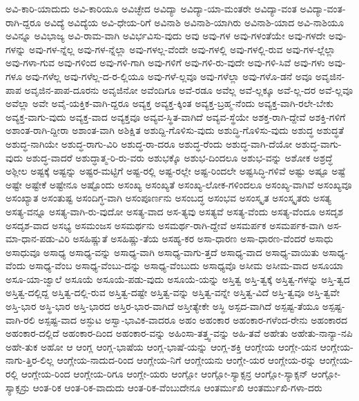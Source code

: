 {ಅವಿ-ಕಾರಿ-ಯಾದುದು
ಅವಿ-ಕಾರಿಯೂ
ಅವಿಚ್ಛೇದ
ಅವಿದ್ಯಾ
ಅವಿದ್ಯಾ-ಯಾ-ಮಂತರೇ
ಅವಿದ್ಯಾ-ವಂತ
ಅವಿದ್ಯಾ-ವಂತ-ರಾಗಿ-ದ್ದರೂ
ಅವಿದ್ಯೆ
ಅವಿದ್ಯೆಯ
ಅವಿ-ಧೇಯ-ರಿಗೆ
ಅವಿನಾಶಿ
ಅವಿನಾಶಿ-ಯಾಗಿರು
ಅವಿನಾಶಿ-ಯಾದ
ಅವಿ-ನಾಶಿಯೂ
ಅವಿನ್ನೂ
ಅವಿಭಾಜ್ಯ
ಅವಿ-ರಾಮ-ವಾಗಿ
ಅವಿರ್ಭವಿಸು-ವುದು
ಅವು
ಅವು-ಗಳ
ಅವು-ಗಳಂತೆಯೇ
ಅವು-ಗಳದೇ
ಅವು-ಗಳನ್ನು
ಅವು-ಗಳ-ನ್ನೆಲ್ಲ
ಅವು-ಗಳ-ನ್ನೆಲ್ಲಾ
ಅವು-ಗಳಲ್ಲ-ವೆಂದೇ
ಅವು-ಗಳಲ್ಲಿ
ಅವು-ಗಳಲ್ಲಿ-ರುವ
ಅವು-ಗಳ-ಲ್ಲೆಲ್ಲಾ
ಅವು-ಗಳಾ-ಗುವ
ಅವು-ಗಳಿಂದ
ಅವು-ಗಳಿ-ಗಾಗಿ
ಅವು-ಗಳಿಗೆ
ಅವು-ಗಳಿ-ರು-ವುದೇ
ಅವು-ಗಳಿ-ಸಿವೆ
ಅವು-ಗಳು
ಅವು-ಗಳೂ
ಅವು-ಗಳೆಲ್ಲ
ಅವು-ಗಳೆಲ್ಲ-ದ-ರ-ಲ್ಲಿಯೂ
ಅವು-ಗಳೆ-ಲ್ಲವೂ
ಅವು-ಗಳೆಲ್ಲಾ
ಅವು-ಗಳೊ-ಡನೆ
ಅವೂ
ಅವೃಜಿನ-ಪಾಪ
ಅವೃಜಿನ-ಪಾಪ-ದೂರನು
ಅವೃಜಿನೋ
ಅವೆಂದಿಗೂ
ಅವೆ-ರಡೂ
ಅವೆಲ್ಲ
ಅವೆ-ಲ್ಲಕ್ಕೂ
ಅವೆ-ಲ್ಲ-ದರ
ಅವೆ-ಲ್ಲವೂ
ಅವೆಲ್ಲಾ
ಅವೇ
ಅವೈ-ಯಕ್ತಿಕ-ವಾಗಿ-ದ್ದರೂ
ಅವ್ಯಕ್ತ
ಅವ್ಯಕ್ತ-ಕ್ಕಿಂತ
ಅವ್ಯಕ್ತ-ಬ್ರಹ್ಮ-ನೆಂದು
ಅವ್ಯಕ್ತ-ವಾಗಿ-ರಲೇ-ಬೇಕು
ಅವ್ಯಕ್ತ-ವಾಗು-ವುದು
ಅವ್ಯಕ್ತ-ವಾದ
ಅವ್ಯಕ್ತವೂ
ಅವ್ಯವ-ಸ್ಥಿತ-ವಾಗಿದೆ
ಅವ್ಯವ-ಸ್ಥೆಯೇ
ಅಶಕ್ತ-ರಾಗಿ-ದ್ದೇವೆ
ಅಶಕ್ತಿ-ಗಳಿಗೆ
ಅಶಾಂತ-ರಾಗಿ-ದ್ದೀರಾ
ಅಶಾಂತ-ವಾಗಿ
ಅಶಿಕ್ಷಿತ
ಅಶುದ್ದಿ-ಗೊಳಿಸು-ವುದು
ಅಶುದ್ಧಿ-ಗೊಳಿಸು-ವುದು
ಅಶುದ್ಧ
ಅಶುದ್ಧತೆ
ಅಶುದ್ಧ-ನಾಗಿಯೇ
ಅಶುದ್ಧ-ರಾಗು-ವಿರಿ
ಅಶುದ್ಧ-ರಾ-ದರೂ
ಅಶುದ್ಧ-ರೆಂದು
ಅಶುದ್ಧ-ವಾಗಿ-ದೆಯೋ
ಅಶುದ್ಧ-ವಾಗು-ವುದು
ಅಶುದ್ಧ-ವಾದರೆ
ಅಶುದ್ಧಾತ್ಮ-ರಿ-ರು-ವರು
ಅಶುಭಕ್ಕೊ
ಅಶುಭ-ದಿಂದಲೂ
ಅಶುಭ-ವನ್ನು
ಅಶೋಕ
ಅಶ್ರದ್ಧೆ
ಅಶ್ಲೀಲ
ಅಷ್ಟಕ್ಕೆ
ಅಷ್ಟನ್ನು
ಅಷ್ಟರ-ಮಟ್ಟಿಗೆ
ಅಷ್ಟ-ರಲ್ಲಿ
ಅಷ್ಟ-ರಲ್ಲೇ
ಅಷ್ಟ-ರಿಂದಲೇ
ಅಷ್ಟಸಿದ್ಧಿ-ಗಳಿವೆ
ಅಷ್ಟು
ಅಷ್ಟೂ
ಅಷ್ಟೆ
ಅಷ್ಟೇ
ಅಷ್ಟೇಕೆ
ಅಷ್ಟೇನೂ
ಅಷ್ಟೊಂದು
ಅಸಂಖ್ಯ
ಅಸಂಖ್ಯತೆ
ಅಸಂಖ್ಯ-ಲೋಕ-ಗಳಿಂದಲೂ
ಅಸಂಖ್ಯ-ವಾಗಿವೆ
ಅಸಂಖ್ಯವೂ
ಅಸಂಖ್ಯಾತ
ಅಸಂತುಷ್ಟ
ಅಸಂದಿಗ್ಧ-ವಾಗಿ
ಅಸಂಪೂರ್ಣನು
ಅಸಂಬದ್ಧ
ಅಸಂಭವ
ಅಸಂಸ್ಕೃತ
ಅಸಂಸ್ಕೃತರು
ಅಸತ್ಯ
ಅಸತ್ಯ-ವನ್ನೂ
ಅಸತ್ಯ-ವಾಗಿ-ರು-ವುದೋ
ಅಸತ್ಯ-ವಾದ
ಅಸ-ತ್ಯವು
ಅಸತ್ಯವೆ
ಅಸತ್ಯ-ವೆಂದು
ಅಸತ್ಯ-ವೆಂದೂ
ಅಸದೃಶ
ಅಸದೃಶ-ವಾದ
ಅಸಭ್ಯ
ಅಸಮಂಜಸ
ಅಸಮರ್ಥನು
ಅಸಮರ್ಥ-ರಾಗಿ-ದ್ದೇವೆ
ಅಸಮರ್ಪಕ
ಅಸಮರ್ಪಕ-ವಾಗಿ
ಅಸ-ಮಾ-ಧಾನ-ಪಡು-ವಿರಿ
ಅಸಹಿಷ್ಣುತೆ
ಅಸಹಿಷ್ಣು-ತೆಯ
ಅಸಹ್ಯ-ಕರ
ಅಸಾ-ಧಾರಣ
ಅಸಾ-ಧಾರಣ-ವೆಂದರೆ
ಅಸಾಧು
ಅಸಾಧುವೂ
ಅಸಾಧ್ಯ
ಅಸಾಧ್ಯ-ವನ್ನು
ಅಸಾಧ್ಯ-ವಾಗಿ
ಅಸಾಧ್ಯ-ವಾಗು-ತ್ತದೆ
ಅಸಾಧ್ಯ-ವಾದ
ಅಸಾಧ್ಯ-ವಾಯಿತು
ಅಸಾಧ್ಯ-ವೆಂದು
ಅಸಾಧ್ಯ-ವೆಂಬ
ಅಸಾಧ್ಯ-ವೆಂಬು-ದನ್ನು
ಅಸಾಧ್ಯ-ವೆಂಬುದು
ಅಸಾಧ್ಯವೊ
ಅಸೀಮ
ಅಸೀಮ-ವಾದ
ಅಸೂಯಾ
ಅಸೂ-ಯಾ-ಜ್ವಾಲೆ
ಅಸೂಯೆ
ಅಸೂಯೆ-ಪಡು-ವುದು
ಅಸೂಯೆ-ಯನ್ನು
ಅಸ್ತಿತ್ವ
ಅಸ್ತಿ-ತ್ವಕ್ಕೆ
ಅಸ್ತಿತ್ವ-ಗಳನ್ನು
ಅಸ್ತಿ-ತ್ವದ
ಅಸ್ತಿತ್ವ-ದಲ್ಲಿದ್ದ
ಅಸ್ತಿತ್ವ-ದಲ್ಲಿ-ರುವ
ಅಸ್ತಿತ್ವ-ದಷ್ಟೇ
ಅಸ್ತಿತ್ವ-ವನ್ನು
ಅಸ್ತಿತ್ವ-ವನ್ನೇ
ಅಸ್ತಿತ್ವ-ವಿದೆ
ಅಸ್ತಿ-ತ್ವವೂ
ಅಸ್ತಿ-ತ್ವವೇ
ಅಸ್ತಿ-ಭಾರ
ಅಸ್ಥಿ-ಭಾರ
ಅಸ್ತಿ-ಭಾರದ
ಅಸ್ತಿರ-ಭಾರ-ವಾಗಿದೆ
ಅಸ್ತೀತ್ಯೇಕೇ
ಅಸ್ಥಿ
ಅಸ್ಪದ-ವಾಗಿದೆ
ಅಸ್ಪಷ್ಟ-ತೆಯೂ
ಅಸ್ಪಷ್ಟ-ವಾಗಿ-ರಲಿ
ಅಸ್ಪಷ್ಟ-ವಾದ
ಅಸ್ಫುಟ
ಅಸ್ವಾ-ಭಾವಿಕ-ವಾದರೂ
ಅಹಂ
ಅಹಂಕಾರ
ಅಹಂಕಾರ-ಗಳೆಂದ-ರೇನು
ಅಹಂಕಾರದ
ಅಹಂಕಾರ-ದಲ್ಲಿದೆ
ಅಹಂಕಾರ-ದಿಂದ
ಅಹಂಕಾರ-ವನ್ನು
ಅಹಿಂಸಾ-ತತ್ತ್ವ-ವನ್ನು
ಅಹಿ-ತವೆ
ಅಹೇತು
ಅಹೇತು-ನಾನ್ಯಾ-ನಪಿ
ಅಹೇ-ತುಕ
ಅಹೋ
ಆ
ಆಂಗ್ಲ
ಆಂಗ್ಲ-ಭಾಷೆಯ
ಆಂಗ್ಲ-ಭಾಷೆ-ಯನ್ನು
ಆಂಗ್ಲ-ಶಕ್ತಿ
ಆಂಗ್ಲೇಯ
ಆಂಗ್ಲೇ-ಯನ
ಆಂಗ್ಲೇಯ-ನಾಗು-ತ್ತಿರ-ಲಿಲ್ಲ
ಆಂಗ್ಲೇಯ-ನಾದುದ-ರಿಂದ
ಆಂಗ್ಲೇಯ-ನಿಗೆ
ಆಂಗ್ಲೇಯನು
ಆಂಗ್ಲೇ-ಯರ
ಆಂಗ್ಲೇಯ-ರನ್ನು
ಆಂಗ್ಲೇಯ-ರಲ್ಲಿ
ಆಂಗ್ಲೇಯ-ರಿಂದ
ಆಂಗ್ಲೇಯ-ರಿಗೂ
ಆಂಗ್ಲೇ-ಯರು
ಆಂಗ್ಲೋ
ಆಂಗ್ಲೋ-ಸ್ಯಾಕ್ಸನ್ರ
ಆಂಗ್ಲೋ-ಸ್ಯಾಕ್ಸನ್
ಆಂಗ್ಲೋ-ಸ್ಯಾಕ್ಸನ್ರು
ಆಂತ-ರಿಕ
ಆಂತ-ರಿಕ-ವಾದುದು
ಆಂತ-ರಿಕ-ವೆಂಬುದೇನೂ
ಆಂತರ್ಮುಖಿ
ಆಂತರ್ಮುಖಿ-ಗಳಾ-ದರು
}
